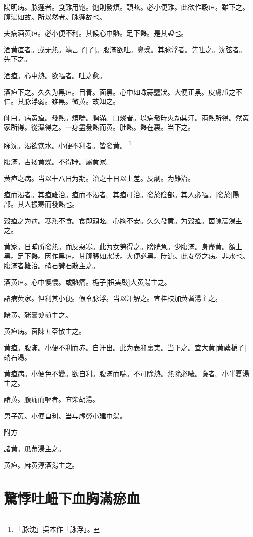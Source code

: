\documentclass[11pt,oneside,b5paper]{ctexbook}
\begin{document}
\begin{flushleft}
陽明病。脉遲者。食難用饱。饱則發煩。頭眩。必小便難。此欲作穀疸。雖下之。腹滿如故。所以然者。脉遲故也。

夫病酒黄疸。必小便不利。其候心中熱。足下熱。是其證也。

酒黄疸者。或无熱。靖言了[了]。腹滿欲吐。鼻燥。其脉浮者。先吐之。沈弦者。先下之。

酒疸。心中熱。欲嘔者。吐之愈。

酒疸下之。久久为黑疸。目青。面黑。心中如噉蒜虀狀。大便正黑。皮膚爪之不仁。其脉浮弱。雖黑。微黄。故知之。

師曰。病黄疸。發熱。煩喘。胸滿。口燥者。以病發時火劫其汗。兩熱所得。然黄家所得。從濕得之。一身盡發熱而黄。肚熱。熱在裏。当下之。

脉沈。渴欲饮水。小便不利者。皆發黄。
\footnote{「脉沈」吳本作「脉浮」。}

腹滿。舌痿黄燥。不得睡。屬黄家。

黄疸之病。当以十八日为期。治之十日以上差。反劇。为難治。

疸而渴者。其疸難治。疸而不渴者。其疸可治。發於陰部。其人必嘔。[發於]陽部。其人振寒而發熱也。

穀疸之为病。寒熱不食。食即頭眩。心胸不安。久久發黄。为穀疸。茵陳蒿湯主之。

黄家。日晡所發熱。而反惡寒。此为女勞得之。膀胱急。少腹滿。身盡黄。額上黑。足下熱。因作黑疸。其腹脹如水狀。大便必黑。時溏。此女勞之病。非水也。腹滿者難治。硝石礬石散主之。

酒黄疸。心中懊憹。或熱痛。梔子[枳実豉]大黄湯主之。

諸病黄家。但利其小便。假令脉浮。当以汗解之。宜桂枝加黄耆湯主之。

諸黄。豬膏髮煎主之。

黄疸病。茵陳五苓散主之。

黄疸。腹滿。小便不利而赤。自汗出。此为表和裏実。当下之。宜大黄[黄蘗梔子]硝石湯。

黄疸病。小便色不變。欲自利。腹滿而喘。不可除熱。熱除必噦。噦者。小半夏湯主之。

諸黄。腹痛而嘔者。宜柴胡湯。

男子黄。小便自利。当与虛勞小建中湯。

附方

諸黄。瓜蒂湯主之。

黄疸。麻黄淳酒湯主之。

\chapter{驚悸吐衄下血胸滿瘀血}


\end{flushleft}
\end{document}
